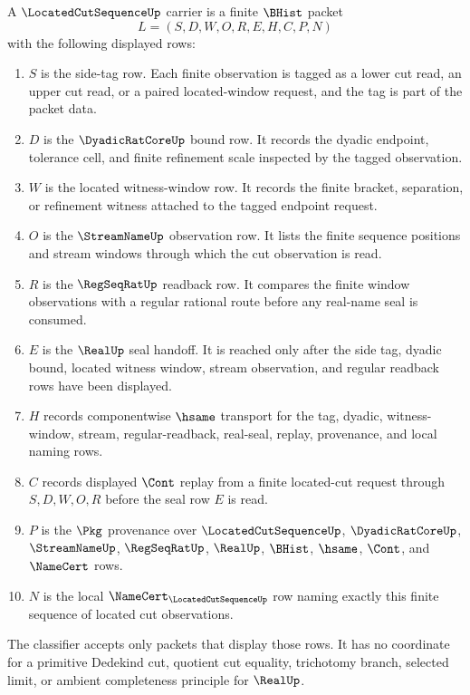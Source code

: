\begin{definition}
\label{def:located-cut-sequence-carrier}
A $\LocatedCutSequenceUp$ carrier is a finite $\BHist$ packet
$$
L=(S,D,W,O,R,E,H,C,P,N)
$$
with the following displayed rows:
\begin{enumerate}
\item $S$ is the side-tag row. Each finite observation is tagged as a lower cut read, an upper cut read, or a paired located-window request, and the tag is part of the packet data.
\item $D$ is the $\DyadicRatCoreUp$ bound row. It records the dyadic endpoint, tolerance cell, and finite refinement scale inspected by the tagged observation.
\item $W$ is the located witness-window row. It records the finite bracket, separation, or refinement witness attached to the tagged endpoint request.
\item $O$ is the $\StreamNameUp$ observation row. It lists the finite sequence positions and stream windows through which the cut observation is read.
\item $R$ is the $\RegSeqRatUp$ readback row. It compares the finite window observations with a regular rational route before any real-name seal is consumed.
\item $E$ is the $\RealUp$ seal handoff. It is reached only after the side tag, dyadic bound, located witness window, stream observation, and regular readback rows have been displayed.
\item $H$ records componentwise $\hsame$ transport for the tag, dyadic, witness-window, stream, regular-readback, real-seal, replay, provenance, and local naming rows.
\item $C$ records displayed $\Cont$ replay from a finite located-cut request through $S,D,W,O,R$ before the seal row $E$ is read.
\item $P$ is the $\Pkg$ provenance over $\LocatedCutSequenceUp$, $\DyadicRatCoreUp$, $\StreamNameUp$, $\RegSeqRatUp$, $\RealUp$, $\BHist$, $\hsame$, $\Cont$, and $\NameCert$ rows.
\item $N$ is the local $\NameCert_{\LocatedCutSequenceUp}$ row naming exactly this finite sequence of located cut observations.
\end{enumerate}
The classifier accepts only packets that display those rows. It has no coordinate for a primitive Dedekind cut, quotient cut equality, trichotomy branch, selected limit, or ambient completeness principle for $\RealUp$.
\end{definition}

